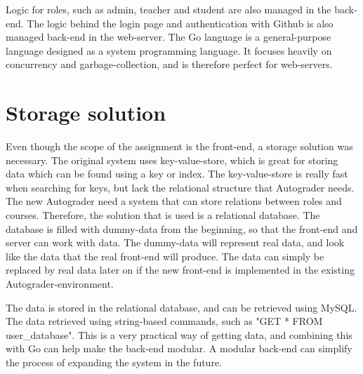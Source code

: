 Logic for roles, such as admin, teacher and student are also managed in the back-end. The logic behind the login page and authentication with Github is also managed back-end in the web-server. The Go language is a general-purpose language designed as a system programming language. It focuses heavily on concurrency and garbage-collection, and is therefore perfect for web-servers.

\section{Storage solution}
Even though the scope of the assignment is the front-end, a storage solution was necessary. The original system uses key-value-store, which is great for storing data which can be found using a key or index. The key-value-store is really fast when searching for keys, but lack the relational structure that Autograder needs. The new Autograder need a system that can store relations between roles and courses. Therefore, the solution that is used is a relational database. The database is filled with dummy-data from the beginning, so that the front-end and server can work with data. The dummy-data will represent real data, and look like the data that the real front-end will produce. The data can simply be replaced by real data later on if the new front-end is implemented in the existing Autograder-environment.

The data is stored in the relational database, and can be retrieved using MySQL. The data retrieved using string-based commands, such as "GET * FROM user\_database". This is a very practical way of getting data, and combining this with Go can help make the back-end modular. A modular back-end can simplify the process of expanding the system in the future.

